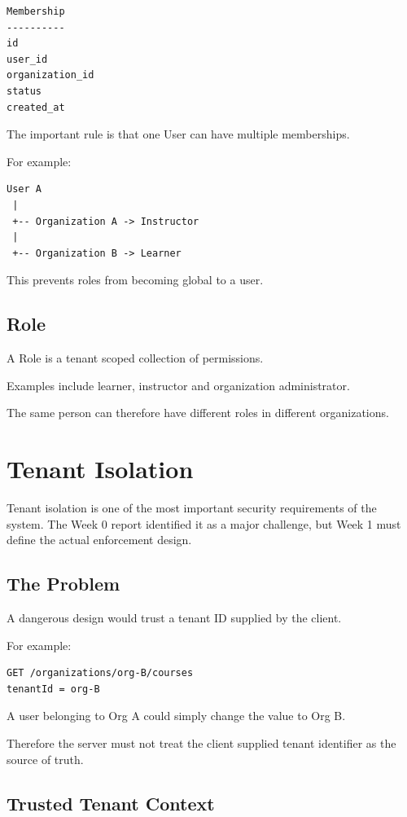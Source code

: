 \documentclass[11pt,a4paper]{article}
\begin{document}
\begin{verbatim}
Membership
----------
id
user_id
organization_id
status
created_at
\end{verbatim}

The important rule is that one User can have multiple memberships.

For example:

\begin{verbatim}
User A
 |
 +-- Organization A -> Instructor
 |
 +-- Organization B -> Learner
\end{verbatim}

This prevents roles from becoming global to a user.

\subsection{Role}

A Role is a tenant scoped collection of permissions.

Examples include learner, instructor and organization administrator.

The same person can therefore have different roles in different organizations.

\section{Tenant Isolation}

Tenant isolation is one of the most important security requirements of the system. The Week 0 report identified it as a major challenge, but Week 1 must define the actual enforcement design.

\subsection{The Problem}

A dangerous design would trust a tenant ID supplied by the client.

For example:

\begin{verbatim}
GET /organizations/org-B/courses
tenantId = org-B
\end{verbatim}

A user belonging to Org A could simply change the value to Org B.

Therefore the server must not treat the client supplied tenant identifier as the source of truth.

\subsection{Trusted Tenant Context}
\end{document}
